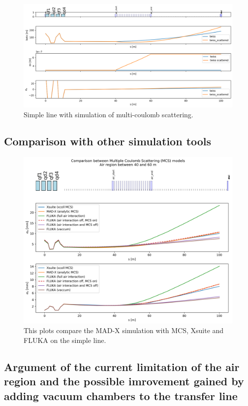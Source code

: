 \documentclass[a4paper,
               biblatex,     %
               ]{jacow}
\begin{document}
\begin{figure}[!htb]
   \centering
   \includegraphics*[width=1.0\columnwidth]{air_scattering_1.png}
   \caption{Simple line with simulation of multi-coulomb scattering.}
   \label{fig:simple_line}
\end{figure}

\subsection{Comparison with other simulation tools}

\begin{figure}[!htb]
   \centering
   \includegraphics*[width=1.0\columnwidth]{compare_simulation.png}
   \caption{This plots compare the MAD-X simulation with MCS, Xsuite and FLUKA on the simple line.}
   \label{fig:simple_line}
\end{figure}

\subsection{Argument of the current limitation of the air region and the possible imrovement gained by adding vacuum chambers to the transfer line}
\end{document}
